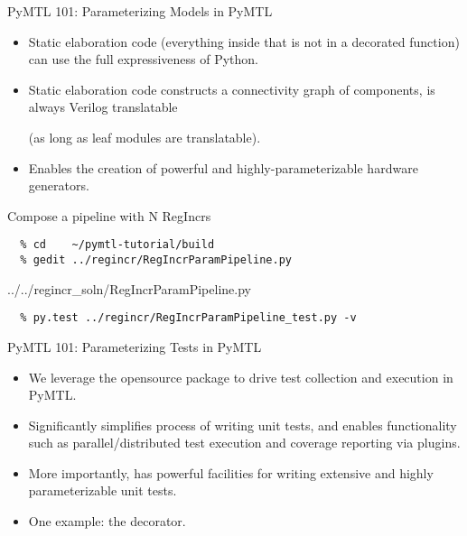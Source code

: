 \begin{frame}{PyMTL 101: Parameterizing Models in PyMTL}
\begin{itemize}
  \item Static elaboration code (everything inside  that
        is not in a decorated function) can use the full expressiveness of
        Python.
  \smallskip
  \item Static elaboration code constructs a connectivity graph of
        components, is always Verilog translatable

        (as long as leaf modules are translatable).
  \smallskip
  \item Enables the creation of powerful and highly-parameterizable
        hardware generators.
\end{itemize}
\end{frame}

\begin{task}\begin{frame}[fragile]{Compose a pipeline with N RegIncrs}
\vspace{-0.25in}
\begin{verbatim}
  % cd    ~/pymtl-tutorial/build
  % gedit ../regincr/RegIncrParamPipeline.py
\end{verbatim}

%
{../../regincr_soln/RegIncrParamPipeline.py}

\begin{verbatim}
  % py.test ../regincr/RegIncrParamPipeline_test.py -v
\end{verbatim}
\end{frame}
\end{task}

\begin{frame}{PyMTL 101: Parameterizing Tests in PyMTL}
\begin{itemize}
  \item We leverage the opensource  package to drive test
        collection and execution in PyMTL.
  \item Significantly simplifies process of writing unit tests, and
        enables functionality such as parallel/distributed test execution
        and coverage reporting via plugins.
  \item More importantly,  has powerful facilities for writing
        extensive and highly parameterizable unit tests.
  \item One example: the  decorator.
\end{itemize}
\end{frame}

